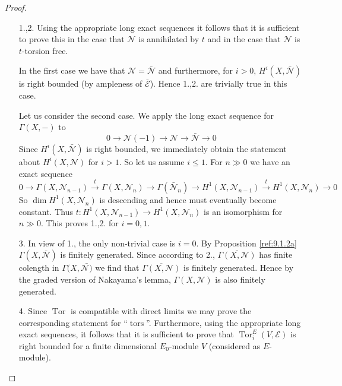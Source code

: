 \documentclass{amsproc}
\def\Escr{{\mathcal E}}
\def\Nscr{{\mathcal N}}
\def\tors{\operatorname{tors}}
\def\Tor{\operatorname {Tor}}
\def\tors{\operatorname {tors}}
\def\r{\rightarrow}
\theoremstyle{definition}
\theoremstyle{remark}
\numberwithin{equation}{section}
\numberwithin{table}{section}
\numberwithin{figure}{section}
\begin{document}
\begin{proof}
\begin{itemize}
\item[1.,2.]
Using the appropriate long exact sequences it follows that it is
sufficient to prove this  in the case that $\Nscr$ is
annihilated by $t$ and in the case that $\Nscr$ is $t$-torsion free.


In the first case we have that $\Nscr=\bar{\Nscr}$
and furthermore, for $i>0$, $H^i(X,\bar{\Nscr})$ is right bounded (by
ampleness of $\bar{\Escr}$). Hence 1.,2. are
 trivially true in this case.

Let us consider the second case. We apply the long exact sequence for
$\Gamma(X,-)$ to
\[
0\r \Nscr(-1)\r \Nscr \r \bar{\Nscr}\r 0
\]
Since $H^i(X,\bar{\Nscr})$ is right bounded, we immediately obtain the
statement about $H^i(X,\Nscr)$ for $i>1$. So let us assume $i\le 1$. For
$n\gg 0$ we have an exact sequence
\[
0\r \Gamma(X,\Nscr_{n-1})\xrightarrow{t} \Gamma(X,\Nscr_n)\r
\Gamma(\bar{\Nscr}_n)\r  H^1(X,\Nscr_{n-1})\xrightarrow{t}
H^1(X,\Nscr_n)\r 0
\]
So $\dim H^1(X,\Nscr_n)$ is descending and hence must eventually become
constant. Thus $t:H^1(X,\Nscr_{n-1})\r H^1(X,\Nscr_n)$ is an isomorphism
for $n\gg 0$. This proves 1.,2. for $i=0,1$.
\item[3.] In view of 1., the only non-trivial case is $i=0$. By
  Proposition \ref{ref:9.1.2a} $\Gamma(X,\bar{\Nscr})$ is finitely
  generated. Since according to 2., $\overline{\Gamma(X,\Nscr)}$ has
  finite colength in $\Gamma(X,\bar{\Nscr)}$ we find that
  $\overline{\Gamma(X,\Nscr)}$ is finitely generated. Hence by the
  graded version of Nakayama's lemma, $\Gamma(X,\Nscr)$ is also
  finitely generated.
\item[4.] Since $\Tor$ is compatible with direct limits 
we may prove the corresponding statement for ``$\tors$''. Furthermore,
using the appropriate long exact sequences, it follows that it is
sufficient to prove that $\Tor_i^E(V,\Escr)$ is right bounded for a
finite dimensional $E_0$-module $V$ (considered as $E$-module).


\end{itemize}
\end{proof}
\end{document}
